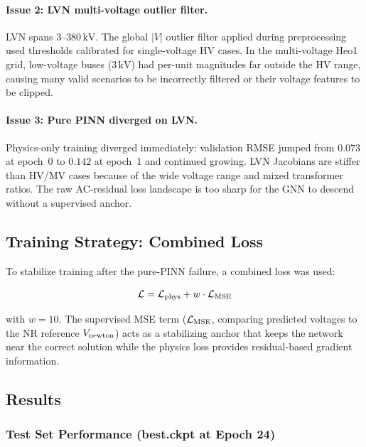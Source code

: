 \documentclass{article}
\begin{document}
\paragraph{Issue 2: LVN multi-voltage outlier filter.}
LVN spans $3$--$380\,\mathrm{kV}$.  The global $|V|$ outlier filter
applied during preprocessing used thresholds calibrated for single-voltage
HV cases.  In the multi-voltage Heo1 grid, low-voltage buses ($3\,\mathrm{kV}$)
had per-unit magnitudes far outside the HV range, causing many valid
scenarios to be incorrectly filtered or their voltage features to be
clipped.

\paragraph{Issue 3: Pure PINN diverged on LVN.}
Physics-only training diverged immediately: validation RMSE jumped from
$0.073$ at epoch~0 to $0.142$ at epoch~1 and continued growing.  LVN
Jacobians are stiffer than HV/MV cases because of the wide voltage range
and mixed transformer ratios.  The raw AC-residual loss landscape is too
sharp for the GNN to descend without a supervised anchor.

\subsection{Training Strategy: Combined Loss}

To stabilize training after the pure-PINN failure, a combined loss was
used:

\begin{equation}
  \mathcal{L}
  =
  \mathcal{L}_{\rm phys}
  +
  w \cdot \mathcal{L}_{\rm MSE}
  \label{eq:combined}
\end{equation}

with $w = 10$.  The supervised MSE term ($\mathcal{L}_{\rm MSE}$, comparing
predicted voltages to the NR reference $V_{\rm newton}$) acts as a
stabilizing anchor that keeps the network near the correct solution while
the physics loss provides residual-based gradient information.

\subsection{Results}

\subsubsection{Test Set Performance (best.ckpt at Epoch 24)}
\end{document}
